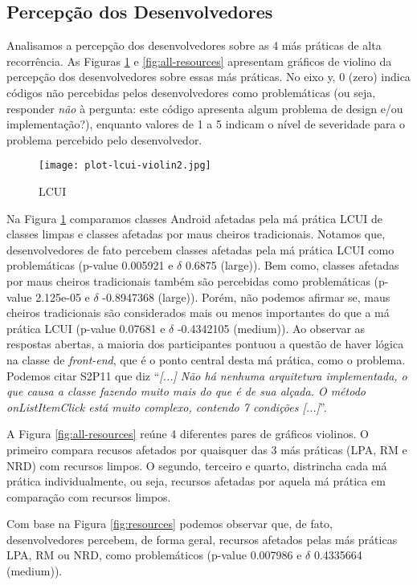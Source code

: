 \subsection{Percepção dos Desenvolvedores}
Analisamos a percepção dos desenvolvedores sobre as 4 más práticas de alta recorrência. As Figuras \ref{fig:lcui} e \ref{fig:all-resources} apresentam gráficos de violino da percepção dos desenvolvedores sobre essas más práticas. No eixo y, 0 (zero) indica códigos não percebidas pelos desenvolvedores como problemáticas (ou seja, responder \emph{não} à pergunta: este código apresenta algum problema de design e/ou implementação?), enquanto valores de 1 a 5 indicam o nível de severidade para o problema percebido pelo desenvolvedor.

\begin{figure}
	\centering
	\texttt{[image: plot-lcui-violin2.jpg]}
	\caption{LCUI}
	\label{fig:lcui}
\end{figure}

Na Figura \ref{fig:lcui} comparamos classes Android afetadas pela má prática LCUI de classes limpas e classes afetadas por maus cheiros tradicionais. Notamos que, desenvolvedores de fato percebem classes afetadas pela má prática LCUI como problemáticas (p-value 0.005921 e $\delta$ 0.6875 (large)). Bem como, classes afetadas por maus cheiros tradicionais também são percebidas como problemáticas (p-value 2.125e-05 e $\delta$ -0.8947368 (large)). Porém, não podemos afirmar se, maus cheiros tradicionais são considerados mais ou menos importantes do que a má prática LCUI (p-value 0.07681 e $\delta$ -0.4342105 (medium)). Ao observar as respostas abertas, a maioria dos participantes pontuou a questão de haver lógica na classe de \textit{front-end}, que é o ponto central desta má prática, como o problema. Podemos citar S2P11 que diz ``\textit{[...] Não há nenhuma arquitetura implementada, o que causa a classe fazendo muito mais do que é de sua alçada. O método onListItemClick está muito complexo, contendo 7 condições [...]}''.

A Figura \ref{fig:all-resources} reúne 4 diferentes pares de gráficos violinos. O primeiro compara recusos afetados por quaisquer das 3 más práticas (LPA, RM e NRD) com recursos limpos. O segundo, terceiro e quarto, distrincha cada má prática individualmente, ou seja, recursos afetadas por aquela má prática em comparação com recursos limpos. 

Com base na Figura \ref{fig:resources} podemos observar que, de fato, desenvolvedores percebem, de forma geral, recursos afetados pelas más práticas LPA, RM ou NRD, como problemáticos (p-value 0.007986 e $\delta$ 0.4335664 (medium)). 

